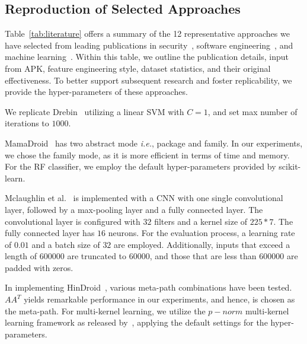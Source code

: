 \subsection{Reproduction of Selected Approaches}
\label{sub:approach_overview}
Table~\ref{tab:literature} offers a summary of the 12 representative approaches we have selected from leading publications in security~\cite{arp2014drebin,mariconti2016mamadroid,mclaughlin2017deep,xu2018deeprefiner,kim2018multimodal,xu2020sdac,he2022msdroid}, software engineering~\cite{wu2019malscan,wu2021homdroid,wu2021android}, and machine learning~\cite{hou2017hindroid,li2021robust}.
Within this table, we outline the publication details, input from APK, feature engineering style, dataset statistics, and their original effectiveness.
To better support subsequent research and foster replicability, we provide the hyper-parameters of these approaches.

We replicate Drebin~\cite{arp2014drebin} utilizing a linear SVM with $C=1$, and set max number of iterations to $1000$.

MamaDroid~\cite{mariconti2016mamadroid} has two abstract mode \textit{i.e.}, package and family.
In our experiments, we chose the family mode, as it is more efficient in terms of time and memory.
For the RF classifier, we employ the default hyper-parameters provided by scikit-learn.

Mclaughlin et al.~\cite{mclaughlin2017deep} is implemented with a CNN with one single convolutional layer, followed by a max-pooling layer and a fully connected layer.
The convolutional layer is configured with $32$ filters and a kernel size of $225*7$.
The fully connected layer has $16$ neurons.
For the evaluation process, a learning rate of $0.01$ and a batch size of $32$ are employed.
Additionally, inputs that exceed a length of $600000$ are truncated to $60000$, and those that are less than $600000$ are padded with zeros.

In implementing HinDroid~\cite{hou2017hindroid}, various meta-path combinations have been tested. 
$AA^{T}$ yields remarkable performance in our experiments, and hence, is chosen as the meta-path.
For multi-kernel learning, we utilize the $p-norm$ multi-kernel learning framework as released by~\cite{sun2010multiple}, applying the default settings for the hyper-parameters.

